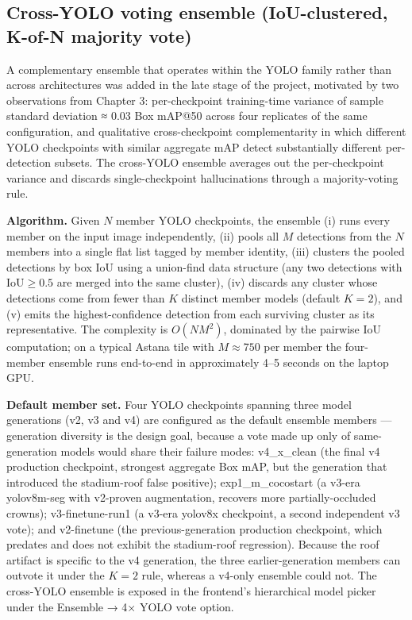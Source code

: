 \subsection{Cross-YOLO voting ensemble (IoU-clustered, K-of-N majority vote)}\label{cross-yolo-voting-ensemble-iou-clustered-k-of-n-majority-vote}

A complementary ensemble that operates within the YOLO family rather than across architectures was added in the late stage of the project, motivated by two observations from Chapter 3: per-checkpoint training-time variance of sample standard deviation ≈ 0.03 Box mAP@50 across four replicates of the same configuration, and qualitative cross-checkpoint complementarity in which different YOLO checkpoints with similar aggregate mAP detect substantially different per-detection subsets. The cross-YOLO ensemble averages out the per-checkpoint variance and discards single-checkpoint hallucinations through a majority-voting rule.

\textbf{Algorithm.} Given \(N\) member YOLO checkpoints, the ensemble (i) runs every member on the input image independently, (ii) pools all \(M\) detections from the \(N\) members into a single flat list tagged by member identity, (iii) clusters the pooled detections by box IoU using a union-find data structure (any two detections with \(\text{IoU} \geq 0.5\) are merged into the same cluster), (iv) discards any cluster whose detections come from fewer than \(K\) distinct member models (default \(K = 2\)), and (v) emits the highest-confidence detection from each surviving cluster as its representative. The complexity is \(O(NM^2)\), dominated by the pairwise IoU computation; on a typical Astana tile with \(M \approx 750\) per member the four-member ensemble runs end-to-end in approximately 4--5 seconds on the laptop GPU.

\textbf{Default member set.} Four YOLO checkpoints spanning three model generations (v2, v3 and v4) are configured as the default ensemble members --- generation diversity is the design goal, because a vote made up only of same-generation models would share their failure modes: v4\_x\_clean (the final v4 production checkpoint, strongest aggregate Box mAP, but the generation that introduced the stadium-roof false positive); exp1\_m\_cocostart (a v3-era yolov8m-seg with v2-proven augmentation, recovers more partially-occluded crowns); v3-finetune-run1 (a v3-era yolov8x checkpoint, a second independent v3 vote); and v2-finetune (the previous-generation production checkpoint, which predates and does not exhibit the stadium-roof regression). Because the roof artifact is specific to the v4 generation, the three earlier-generation members can outvote it under the \(K = 2\) rule, whereas a v4-only ensemble could not. The cross-YOLO ensemble is exposed in the frontend's hierarchical model picker under the Ensemble → 4× YOLO vote option.

